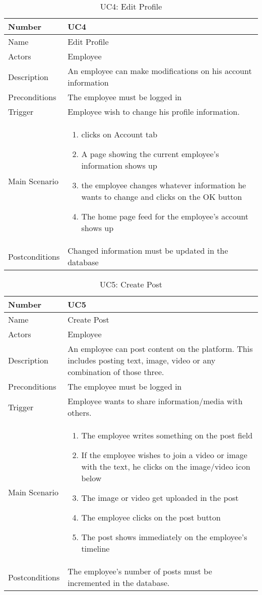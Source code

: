 \documentclass[12pt,a4paper]{article}
\begin{document}
\begin{table}[h]
\centering
\caption{UC4: Edit Profile}
\label{tab:ucm1}
\begin{tabularx}{\textwidth}{@{}lX@{}}
\toprule
Number & UC4 \\ \midrule
Name & Edit Profile \\
Actors & Employee\\
Description & An employee can make modifications on his account information\\
Preconditions & The employee must be logged in \\
Trigger & Employee wish to change his profile information.\\
Main Scenario & 
\begin{enumerate}
\item clicks on Account tab
\item A page showing the current employee’s information shows up
\item the employee changes whatever information he wants to change and clicks on the OK button
\item The home page feed for the employee’s account shows up

\end{enumerate} \\
Postconditions & Changed information must be updated in the database \\
\bottomrule
\end{tabularx}
\end{table}

\begin{table}[h]
\centering
\caption{UC5: Create Post}
\label{tab:ucm1}
\begin{tabularx}{\textwidth}{@{}lX@{}}
\toprule
Number & UC5 \\ \midrule
Name & Create Post \\
Actors & Employee\\
Description & An employee can post content on the platform. This includes posting text, image, video or any combination of those three. \\
Preconditions & The employee must be logged in \\
Trigger & Employee wants to share information/media with others.\\
Main Scenario & 
\begin{enumerate}
\item The employee writes something on the post field
\item If the employee wishes to join a video or image with the text, he clicks on the image/video icon below
\item The image or video get uploaded in the post
\item The employee clicks on the post button
\item The post shows immediately on the employee’s timeline
\end{enumerate} \\
Postconditions & The employee’s number of posts must be incremented in the database.
 \\
\bottomrule
\end{tabularx}
\end{table}
\end{document}
